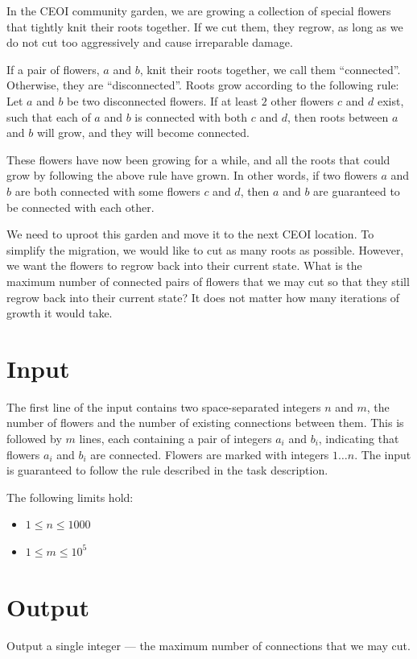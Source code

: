 
In the CEOI community garden, we are growing a collection of special flowers
that tightly knit their roots together. If we cut them, they regrow, as long as
we do not cut too aggressively and cause irreparable damage.

If a pair of flowers, $a$ and $b$, knit their roots together, we call them
``connected''. Otherwise, they are ``disconnected''. Roots grow according to the
following rule: Let $a$ and $b$ be two disconnected flowers. If at least $2$
other flowers $c$ and $d$ exist, such that each of $a$ and $b$ is connected with
both $c$ and $d$, then roots between $a$ and $b$ will grow, and they will become
connected.

These flowers have now been growing for a while, and all the roots that could
grow by following the above rule have grown. In other words, if two flowers $a$
and $b$ are both connected with some flowers $c$ and $d$, then $a$ and $b$ are
guaranteed to be connected with each other.

We need to uproot this garden and move it to the next CEOI location. To simplify
the migration, we would like to cut as many roots as possible. However, we want
the flowers to regrow back into their current state. What is the maximum number
of connected pairs of flowers that we may cut so that they still regrow back
into their current state? It does not matter how many iterations of growth it
would take.

\section*{Input}
The first line of the input contains two space-separated integers $n$ and $m$,
the number of flowers and the number of existing connections between them. This
is followed by $m$ lines, each containing a pair of integers $a_i$ and $b_i$,
indicating that flowers $a_i$ and $b_i$ are connected. Flowers are marked with
integers $1 \ldots n$. The input is guaranteed to follow the rule described in
the task description.

The following limits hold:
\begin{itemize}
  \item $1 \leq n \leq 1000$
  \item $1 \leq m \leq 10^5$
\end{itemize}

\section*{Output}
Output a single integer --- the maximum number of connections that we may cut.

